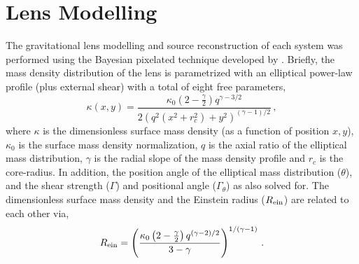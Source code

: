 \documentclass[a4paper,fleqn,usenatbib]{mnras}
\begin{document}

\section{Lens Modelling}

The gravitational lens modelling and source reconstruction of each system was performed using the Bayesian pixelated technique developed by \citet{V09}. Briefly, the mass density distribution of the lens is parametrized with an elliptical power-law profile (plus external shear) with a total of eight free parameters,
\begin{equation}\label{massdensity}
\kappa\left ( x,y \right ) = \frac{\kappa_0 \left ( 2 - \frac{\gamma}{2} \right ) q^{\gamma - 3/2}}{2 \left ( q^2 \left ( x^2 + r_c^2 \right ) + y^2\right )^{\left ( \gamma - 1 \right )/2}}\,, 
\end{equation}
where $\kappa$ is the dimensionless surface mass density (as a function of position $x,y$), $\kappa_0$ is the surface mass density normalization, $q$ is the axial ratio of the elliptical mass distribution, $\gamma$ is the radial slope of the mass density profile and $r_c$ is the core-radius. In addition, the position angle of the elliptical mass distribution ($\theta$), and the shear strength ($\Gamma$) and positional angle ($\Gamma_\theta$) as also solved for. The dimensionless surface mass density and the Einstein radius ($R_{\rm{ein}}$) are related to each other via,
\begin{equation}\label{einsteinradius}
R_{\rm{ein}} = \left ( \frac{\kappa_0 \left ( 2 - \frac{\gamma}{2} \right ) q^{\left ( \gamma - 2 \right )/2}}{3 - \gamma} \right )^{1/\left ( \gamma - 1 \right )}\,.
\end{equation}
\end{document}
